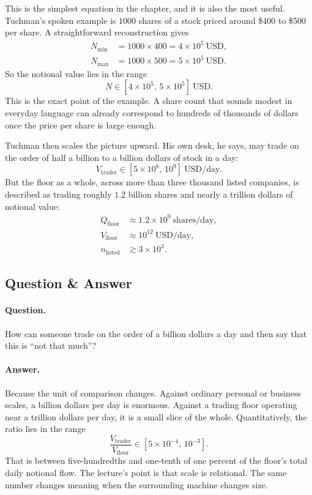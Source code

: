 This is the simplest equation in the chapter, and it is also the most useful. Tuchman's spoken example is $1000$ shares of a stock priced around \$400 to \$500 per share. A straightforward reconstruction gives
\begin{align}
N_{\min} &= 1000\times 400 = 4\times 10^5\ \mathrm{USD},\\
N_{\max} &= 1000\times 500 = 5\times 10^5\ \mathrm{USD}.
\end{align}
So the notional value lies in the range
\begin{equation}
N \in [4\times 10^5,\,5\times 10^5]\ \mathrm{USD}.
\end{equation}
This is the exact point of the example. A share count that sounds modest in everyday language can already correspond to hundreds of thousands of dollars once the price per share is large enough.

Tuchman then scales the picture upward. His own desk, he says, may trade on the order of half a billion to a billion dollars of stock in a day:
\begin{equation}
V_{\mathrm{trader}} \in [5\times 10^8,\,10^9]\ \mathrm{USD/day}.
\end{equation}
But the floor as a whole, across more than three thousand listed companies, is described as trading roughly $1.2$ billion shares and nearly a trillion dollars of notional value:
\begin{align}
Q_{\mathrm{floor}} &\approx 1.2\times 10^9\ \mathrm{shares/day},\\
V_{\mathrm{floor}} &\approx 10^{12}\ \mathrm{USD/day},\\
n_{\mathrm{listed}} &\gtrsim 3\times 10^3.
\end{align}

\subsection{Question \& Answer}

\paragraph{Question.} How can someone trade on the order of a billion dollars a day and then say that this is ``not that much''?

\paragraph{Answer.} Because the unit of comparison changes. Against ordinary personal or business scales, a billion dollars per day is enormous. Against a trading floor operating near a trillion dollars per day, it is a small slice of the whole. Quantitatively, the ratio lies in the range
\begin{equation}
\frac{V_{\mathrm{trader}}}{V_{\mathrm{floor}}} \in [5\times 10^{-4},\,10^{-3}].
\end{equation}
That is between five-hundredths and one-tenth of one percent of the floor's total daily notional flow. The lecture's point is that scale is relational. The same number changes meaning when the surrounding machine changes size.

